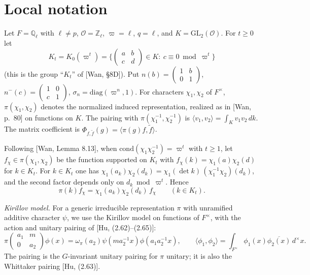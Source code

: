 \documentclass[11pt]{amsart}
\theoremstyle{definition}
\theoremstyle{remark}
\newcommand{\Q}{\mathbb{Q}}
\newcommand{\Z}{\mathbb{Z}}
\newcommand{\cO}{\mathcal{O}}
\newcommand{\GL}{\mathrm{GL}}
\newcommand{\cond}{\mathrm{cond}}
\newcommand{\vp}{\varpi}
\newcommand{\nm}{n^{-}}
\newcommand{\diag}{\mathrm{diag}}
\begin{document}
\section{Local notation}\label{sec:notation}
Let $F=\Q_\ell$ with $\ell\neq p$, $\cO=\Z_\ell$, $\vp=\ell$, $q=\ell$, and $K=\GL_2(\cO)$. For $t\ge 0$ let
\[ K_t=K_0(\vp^t)=\Big\{\begin{pmatrix}a&b\\c&d\end{pmatrix}\in K:\ c\equiv 0 \bmod \vp^t\Big\} \]
(this is the group ``$K_t$'' of [Wan, \S 8D]). Put $n(b)=\begin{pmatrix}1&b\\0&1\end{pmatrix}$, $\nm(c)=\begin{pmatrix}1&0\\c&1\end{pmatrix}$, $\sigma_n=\diag(\vp^n,1)$. For characters $\chi_1,\chi_2$ of $F^\times$, $\pi(\chi_1,\chi_2)$ denotes the normalized induced representation, realized as in [Wan, p.~80] on functions on $K$. The pairing with $\pi(\chi_1^{-1},\chi_2^{-1})$ is $\langle v_1,v_2\rangle=\int_K v_1v_2\,dk$. The matrix coefficient is $\Phi_{f,\tilde f}(g)=\langle\pi(g)f,\tilde f\rangle$.

Following [Wan, Lemma 8.13], when $\cond(\chi_1\chi_2^{-1})=\vp^t$ with $t\ge1$, let $f_\chi\in\pi(\chi_1,\chi_2)$ be the function supported on $K_t$ with $f_\chi(k)=\chi_1(a)\chi_2(d)$ for $k\in K_t$. For $k\in K_t$ one has $\chi_1(a_k)\chi_2(d_k)=\chi_1(\det k)\,(\chi_1^{-1}\chi_2)(d_k)$, and the second factor depends only on $d_k\bmod\vp^t$. Hence
\begin{equation}\label{eq:fchi-eigen}
\pi(k)f_\chi=\chi_1(a_k)\chi_2(d_k)\,f_\chi\qquad(k\in K_t).
\end{equation}

\emph{Kirillov model.} For a generic irreducible representation $\pi$ with unramified additive character $\psi$, we use the Kirillov model on functions of $F^\times$, with the action and unitary pairing of [Hu, (2.62)--(2.65)]:
\[
\pi\begin{pmatrix}a_1&m\\0&a_2\end{pmatrix}\phi(x)=\omega_\pi(a_2)\psi(ma_2^{-1}x)\phi(a_1a_2^{-1}x),\qquad \langle \phi_1,\phi_2\rangle=\int_{F^\times}\phi_1(x)\overline{\phi_2(x)}\,d^\times x .
\]
The pairing is the $G$-invariant unitary pairing for $\pi$ unitary; it is also the Whittaker pairing [Hu, (2.63)].
\end{document}
